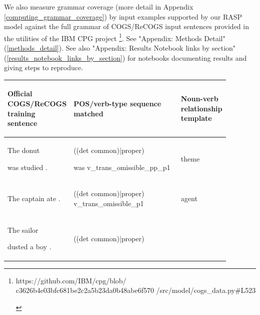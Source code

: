 \documentclass[11pt]{article}
\begin{document}
We also measure grammar coverage \citep{fuzzingbook2023:GrammarCoverageFuzzer} (more detail in Appendix \ref{computing_grammar_coverage}) by input examples supported by our RASP model against the full grammar of COGS/ReCOGS input sentences provided in the utilities of the IBM CPG project \citep{klinger2024compositionalprogramgenerationfewshot}\footnote{\begin{footnotesize}https://github.com/IBM/cpg/blob/
c3626b4e03bfc681be2c2a5b23da0b48abe6f570
/src/model/cogs\_data.py\#L523\end{footnotesize}}. See "Appendix: Methods Detail" (\ref{methods_detail}). See also "Appendix: Results Notebook links by section" (\ref{results_notebook_links_by_section}) for notebooks documenting results and giving steps to reproduce.

\begin{table}
\centering
\begin{tabular}{p{0.225\linewidth} p{0.50\linewidth} p{0.15\linewidth}}
\hline
\begin{tiny}\textbf{Official COGS/ReCOGS training sentence}\end{tiny} & \begin{tiny}\textbf{POS/verb-type sequence matched}\end{tiny} & \begin{tiny}\textbf{Noun-verb relationship template}\end{tiny}\\
\hline
\hline
\begin{tiny}The donut 

was studied .\end{tiny} & \begin{tiny}((det common)|proper)

was v\_trans\_omissible\_pp\_p1\end{tiny} & \begin{tiny}theme\end{tiny} \\
\hline
\begin{tiny}The captain ate .\end{tiny} & \begin{tiny}((det common)|proper) v\_trans\_omissible\_p1\end{tiny} & \begin{tiny}agent\end{tiny} \\
\hline
\begin{tiny}The sailor 

dusted a boy .\end{tiny} & \begin{tiny}((det common)|proper)


\end{tiny}
\end{tabular}
\end{table}
\end{document}

